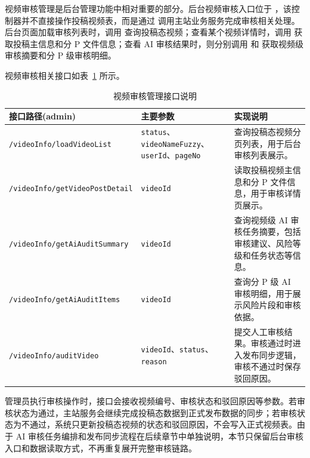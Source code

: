 视频审核管理是后台管理功能中相对重要的部分。后台视频审核入口位于 \texttt{}，该控制器并不直接操作投稿视频表，而是通过 \texttt{} 调用主站业务服务完成审核相关处理。后台页面加载审核列表时，调用 \texttt{} 查询投稿态视频；查看某个视频详情时，调用 \texttt{} 获取投稿主信息和分 P 文件信息；查看 AI 审核结果时，则分别调用 \texttt{} 和 \texttt{} 获取视频级审核摘要和分 P 级审核明细。

视频审核相关接口如表~\ref{tab:admin-video-audit-api} 所示。

\begin{table}[!htbp]
    \centering
    \caption{视频审核管理接口说明}
    \label{tab:admin-video-audit-api}
    \begin{tabular}{p{} p{} p{}}
        \toprule
        \textbf{接口路径(admin)} & \textbf{主要参数} & \textbf{实现说明} \\
        \midrule
        \texttt{/videoInfo/loadVideoList}
        & \texttt{status}、\texttt{videoNameFuzzy}、\texttt{userId}、\texttt{pageNo}
        & 查询投稿态视频分页列表，用于后台审核列表展示。 \\

        \texttt{/videoInfo/getVideoPostDetail}
        & \texttt{videoId}
        & 读取投稿视频主信息和分 P 文件信息，用于审核详情页展示。 \\

        \texttt{/videoInfo/getAiAuditSummary}
        & \texttt{videoId}
        & 查询视频级 AI 审核任务摘要，包括审核建议、风险等级和任务状态等信息。 \\

        \texttt{/videoInfo/getAiAuditItems}
        & \texttt{videoId}
        & 查询分 P 级 AI 审核明细，用于展示风险片段和审核依据。 \\

        \texttt{/videoInfo/auditVideo}
        & \texttt{videoId}、\texttt{status}、\texttt{reason}
        & 提交人工审核结果。审核通过时进入发布同步逻辑，审核不通过时保存驳回原因。 \\
        \bottomrule
    \end{tabular}
\end{table}

管理员执行审核操作时，接口会接收视频编号、审核状态和驳回原因等参数。若审核状态为通过，主站服务会继续完成投稿态数据到正式发布数据的同步；若审核状态为不通过，系统只更新投稿态视频的状态和驳回原因，不会写入正式视频表。由于 AI 审核任务编排和发布同步流程在后续章节中单独说明，本节只保留后台审核入口和数据读取方式，不再重复展开完整审核链路。


